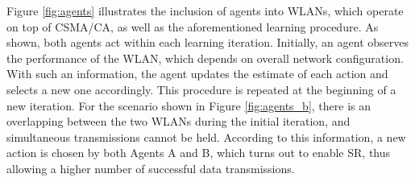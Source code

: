 \documentclass[preprint,12pt]{elsarticle}
\begin{document}
Figure \ref{fig:agents} illustrates the inclusion of agents into WLANs, which operate on top of CSMA/CA, as well as the aforementioned learning procedure. As shown, both agents act within each learning iteration. Initially, an agent observes the performance of the WLAN, which depends on overall network configuration. With such an information, the agent updates the estimate of each action and selects a new one accordingly. This procedure is repeated at the beginning of a new iteration. For the scenario shown in Figure \ref{fig:agents_b}, there is an overlapping between the two WLANs during the initial iteration, and simultaneous transmissions cannot be held. According to this information, a new action is chosen by both Agents A and B, which turns out to enable SR, thus allowing a higher number of successful data transmissions.
\end{document}
